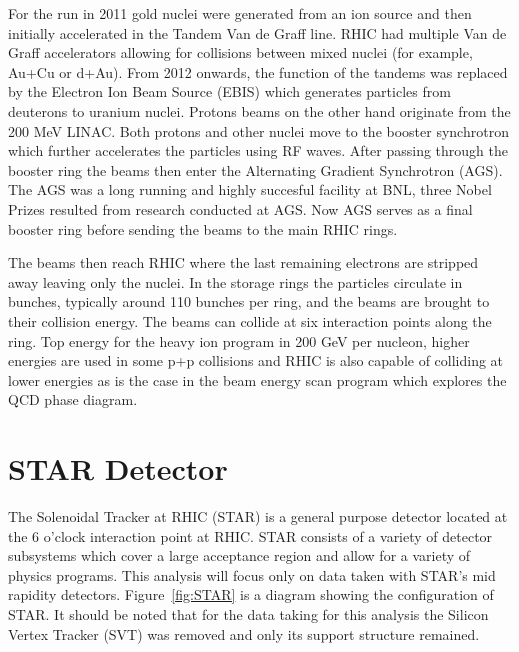 For the run in 2011 gold nuclei were generated from an ion source and then initially accelerated in the Tandem Van de Graff line. RHIC had multiple Van de Graff accelerators allowing for collisions between mixed nuclei (for example, Au+Cu or d+Au). From 2012 onwards, the function of the tandems was replaced by the Electron Ion Beam Source (EBIS) which generates particles from deuterons to uranium nuclei. Protons beams on the other hand originate from the 200 MeV LINAC. Both protons and other nuclei move to the booster synchrotron which further accelerates the particles using RF waves. After passing through the booster ring the beams then enter the Alternating Gradient Synchrotron (AGS). The AGS was a long running and highly succesful facility at BNL, three Nobel Prizes resulted from research conducted at AGS. Now AGS serves as a final booster ring before sending the beams to the main RHIC rings. 

The beams then reach RHIC where the last remaining electrons are stripped away leaving only the nuclei. In the storage rings the particles circulate in bunches, typically around 110 bunches per ring, and the beams are brought to their collision energy. The beams can collide at six interaction points along the ring. Top energy for the heavy ion program in 200 GeV per nucleon, higher energies are used in some p+p collisions and RHIC is also capable of colliding at lower energies as is the case in the beam energy scan program which explores the QCD phase diagram.

\section{STAR Detector}

The Solenoidal Tracker at RHIC (STAR) is a general purpose detector located at the 6 o'clock interaction point at RHIC. STAR consists of a variety of detector subsystems which cover a large acceptance region and allow for a variety of physics programs. This analysis will focus only on data taken with STAR's mid rapidity detectors. Figure~\ref{fig:STAR} is a diagram showing the configuration of STAR. It should be noted that for the data taking for this analysis the Silicon Vertex Tracker (SVT) was removed and only its support structure remained.


